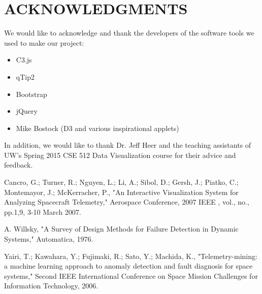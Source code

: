 \documentclass[letterpaper, 10 pt, conference]{ieeeconf}  %
\begin{document}
\section{ACKNOWLEDGMENTS}

We would like to acknowledge and thank the developers of the software tools we used to make our project:

\begin{itemize}
 \item C3.js
 \item qTip2
 \item Bootstrap
 \item jQuery
 \item Mike Bostock (D3 and various inspirational applets)
\end{itemize}

In addition, we would like to thank Dr. Jeff Heer and the teaching assistants of UW's Spring 2015 CSE 512 Data Visualization course for their advice and feedback.


\begin{thebibliography}{99}

Cancro, G.; Turner, R.; Nguyen, L.; Li, A.; Sibol, D.; Gersh, J.; Piatko, C.; Montemayor, J.; McKerracher, P., "An Interactive Visualization System for Analyzing Spacecraft Telemetry," Aerospace Conference, 2007 IEEE , vol., no., pp.1,9, 3-10 March 2007.

A. Willsky, "A Survey of Design Methods for Failure Detection in Dynamic Systems," Automatica, 1976. 

Yairi, T.; Kawahara, Y.; Fujimaki, R.; Sato, Y.; Machida, K., "Telemetry-mining: a machine learning approach to anomaly detection and fault diagnosis for space systems," Second IEEE International Conference on Space Mission Challenges for Information Technology, 2006.

\end{thebibliography}
\end{document}

